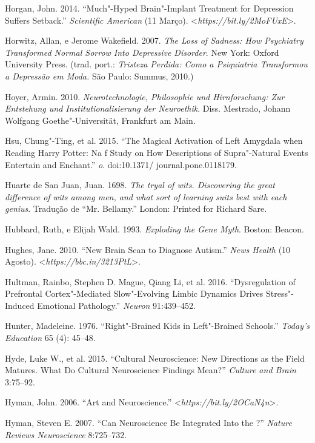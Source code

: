 {\begin{Parskip}
Horgan, John. 2014. ``Much"-Hyped Brain"-Implant Treatment for Depression
Suffers Setback.'' \emph{Scientific American} (11 Março).
\textless{}\emph{https://bit.ly/2MoFUxE}\textgreater{}.

Horwitz, Allan, e Jerome Wakefield. 2007. \emph{The Loss of Sadness: How
Psychiatry Transformed Normal Sorrow Into Depressive Disorder}. New
York: Oxford University Press. (trad. port.: \emph{Tristeza Perdida:
Como a Psiquiatria Transformou a Depressão em Moda.} São Paulo: Summus,
2010.)

Hoyer, Armin. 2010. \emph{Neurotechnologie, Philosophie und
Hirnforschung: Zur Entstehung und Institutionalisierung der Neuroethik}.
Diss. Mestrado, Johann Wolfgang Goethe"-Universität, Frankfurt am Main.

Hsu, Chung"-Ting, et al. 2015. ``The Magical Activation of Left Amygdala
when Reading Harry Potter: Na f Study on How Descriptions of
Supra"-Natural Events Entertain and Enchant.'' \emph{o}.
doi:10.1371/ journal.pone.0118179.

Huarte de San Juan, Juan. 1698. \emph{The tryal of wits. Discovering the
great difference of wits among men, and what sort of learning suits best
with each genius}. Tradução de ``Mr. Bellamy.'' London: Printed for
Richard Sare.

Hubbard, Ruth, e Elijah Wald. 1993. \emph{Exploding the Gene Myth}.
Boston: Beacon.

Hughes, Jane. 2010. ``New Brain Scan to Diagnose Autism.'' \emph{
News Health} (10 Agosto).
\textless{}\emph{https://bbc.in/3213PtL}\textgreater{}.

Hultman, Rainbo, Stephen D. Mague, Qiang Li, et al. 2016.
``Dysregulation of Prefrontal Cortex"-Mediated Slow"-Evolving Limbic
Dynamics Drives Stress"-Induced Emotional Pathology.'' \emph{Neuron}
91:439--452.

Hunter, Madeleine. 1976. ``Right"-Brained Kids in Left"-Brained Schools.''
\emph{Today's Education} 65 (4): 45--48.

Hyde, Luke W., et al. 2015. ``Cultural Neuroscience: New Directions as
the Field Matures. What Do Cultural Neuroscience Findings Mean?''
\emph{Culture and Brain} 3:75--92.

Hyman, John. 2006. ``Art and Neuroscience.''
\textless{}\emph{https://bit.ly/2OCaN4n}\textgreater{}.

Hyman, Steven E. 2007. ``Can Neuroscience Be Integrated Into the ?''
\emph{Nature Reviews Neuroscience} 8:725--732.


\end{Parskip}}
